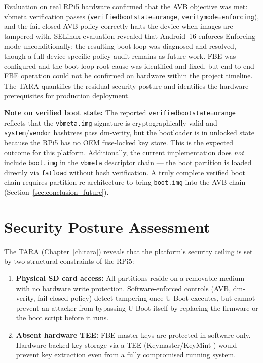 Evaluation on real RPi5 hardware confirmed that the AVB objective was met: vbmeta verification passes (\texttt{verifiedbootstate=orange}, \texttt{veritymode=enforcing}), and the fail-closed AVB policy correctly halts the device when images are tampered with. SELinux evaluation revealed that Android~16 enforces Enforcing mode unconditionally; the resulting boot loop was diagnosed and resolved, though a full device-specific policy audit remains as future work. FBE was configured and the boot loop root cause was identified and fixed, but end-to-end FBE operation could not be confirmed on hardware within the project timeline. The TARA quantifies the residual security posture and identifies the hardware prerequisites for production deployment.

\textbf{Note on verified boot state:} The reported \texttt{verifiedbootstate=orange} reflects that the \texttt{vbmeta.img} signature is cryptographically valid and \texttt{system}/\texttt{vendor} hashtrees pass dm-verity, but the bootloader is in unlocked state because the RPi5 has no OEM fuse-locked key store. This is the expected outcome for this platform. Additionally, the current implementation does \emph{not} include \texttt{boot.img} in the \texttt{vbmeta} descriptor chain --- the boot partition is loaded directly via \texttt{fatload} without hash verification. A truly complete verified boot chain requires partition re-architecture to bring \texttt{boot.img} into the AVB chain (Section~\ref{sec:conclusion_future}).

\section{Security Posture Assessment}

The TARA (Chapter~\ref{ch:tara}) reveals that the platform's security ceiling is set by two structural constraints of the RPi5:

\begin{enumerate}
    \item \textbf{Physical SD card access:} All partitions reside on a removable medium with no hardware write protection. Software-enforced controls (AVB, dm-verity, fail-closed policy) detect tampering once U-Boot executes, but cannot prevent an attacker from bypassing U-Boot itself by replacing the firmware or the boot script before it runs.

    \item \textbf{Absent hardware TEE:} FBE master keys are protected in software only. Hardware-backed key storage via a TEE (Keymaster/KeyMint \cite{android_keystore_hw}) would prevent key extraction even from a fully compromised running system.
\end{enumerate}

